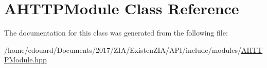 \hypertarget{classAHTTPModule}{}\section{A\+H\+T\+T\+P\+Module Class Reference}
\label{classAHTTPModule}


The documentation for this class was generated from the following file\+:\begin{DoxyCompactItemize}
\item 
/home/edouard/\+Documents/2017/\+Z\+I\+A/\+Existen\+Z\+I\+A/\+A\+P\+I/include/modules/\mbox{\hyperlink{AHTTPModule_8hpp}{A\+H\+T\+T\+P\+Module.\+hpp}}\end{DoxyCompactItemize}
